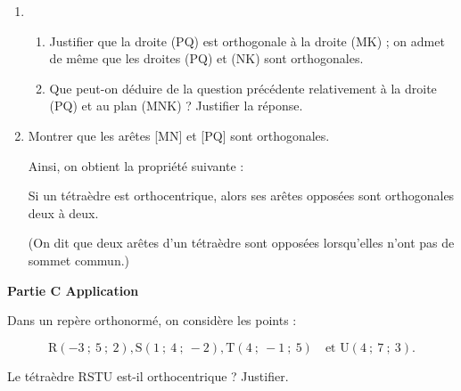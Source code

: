 \documentclass{cornouaille}
\begin{document}
\begin{exercice}
\begin{enumerate}
\item 
	\begin{enumerate}
		\item Justifier que la droite (PQ) est orthogonale à la droite (MK) ; on admet de même que les droites (PQ) et (NK) sont orthogonales.
		\item Que peut-on déduire de la question précédente relativement à la droite (PQ) et au plan (MNK) ? Justifier la réponse.
 	\end{enumerate}
\item Montrer que les arêtes [MN] et [PQ] sont orthogonales.
	
Ainsi, on obtient la propriété suivante :
	
Si un tétraèdre est orthocentrique, alors ses arêtes opposées sont orthogonales deux à deux.
	
(On dit que deux arêtes d'un tétraèdre sont \og opposées\fg{} lorsqu'elles n'ont pas de sommet commun.)
\end{enumerate}

\bigskip

\textbf{Partie C Application}

\medskip

Dans un repère orthonormé, on considère les points :

\[\text{R}(-3~;~5~;~2) ,\text{S}(1~;~4~;~-2) , \text{T}(4~;~-1~;~5)\quad  \text{et U}(4~;~7~;~3).\]

Le tétraèdre RSTU est-il orthocentrique ? Justifier.
\end{exercice}
\newpage
\end{document}
